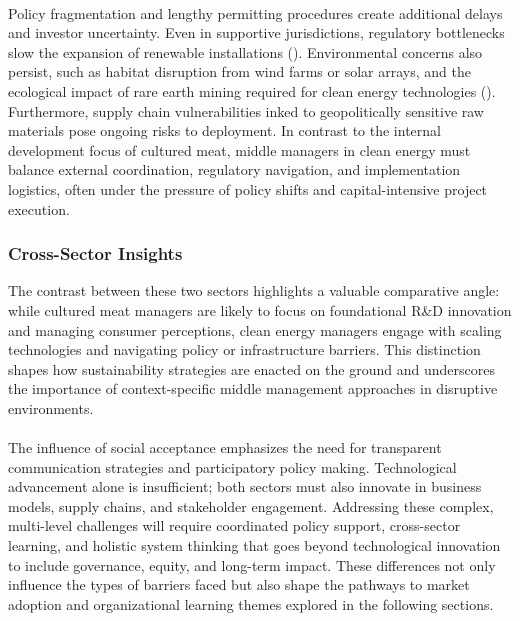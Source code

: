 	\paragraph*{} Policy fragmentation and lengthy permitting procedures create additional delays and investor uncertainty. Even in supportive jurisdictions, regulatory bottlenecks slow the expansion of renewable installations (\textcite{OECD2022}). Environmental concerns also persist, such as habitat disruption from wind farms or solar arrays, and the ecological impact of rare earth mining required for clean energy technologies (\textcite{IEA2021}). Furthermore, supply chain vulnerabilities inked to geopolitically sensitive raw materials pose ongoing risks to deployment. In contrast to the internal development focus of cultured meat, middle managers in clean energy must balance external coordination, regulatory navigation, and implementation logistics, often under the pressure of policy shifts and capital-intensive project execution.
	
	\subsubsection{Cross-Sector Insights}
	The contrast between these two sectors highlights a valuable comparative angle: while cultured meat managers are likely to focus on foundational R\&D innovation and managing consumer perceptions, clean energy managers engage with scaling technologies and navigating policy or infrastructure barriers. This distinction shapes how sustainability strategies are enacted on the ground and underscores the importance of context-specific middle management approaches in disruptive environments.
	
	\paragraph*{} The influence of social acceptance emphasizes the need for transparent communication strategies and participatory policy making. Technological advancement alone is insufficient; both sectors must also innovate in business models, supply chains, and stakeholder engagement. Addressing these complex, multi-level challenges will require coordinated policy support, cross-sector learning, and holistic system thinking that goes beyond technological innovation to include governance, equity, and long-term impact. These differences not only influence the types of barriers faced but also shape the pathways to market adoption and organizational learning themes explored in the following sections.
	
